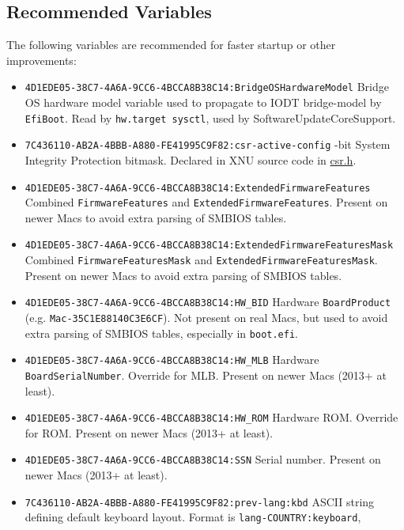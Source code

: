 \documentclass[]{article}
\providecommand{\tightlist}{%
  \setlength{\itemsep}{0pt}\setlength{\parskip}{0pt}}
\begin{document}
\subsection{Recommended Variables}\label{nvramvarsrec}

The following variables are recommended for faster startup or other
improvements:

\begin{itemize}
\tightlist
\item
  \texttt{4D1EDE05-38C7-4A6A-9CC6-4BCCA8B38C14:BridgeOSHardwareModel}
  \break
  Bridge OS hardware model variable used to propagate to IODT bridge-model
  by \texttt{EfiBoot}. Read by \texttt{hw.target sysctl}, used by
  SoftwareUpdateCoreSupport.
\item
  \texttt{7C436110-AB2A-4BBB-A880-FE41995C9F82:csr-active-config}
  -bit System Integrity Protection bitmask. Declared in XNU source code in
  \href{https://opensource.apple.com/source/xnu/xnu-4570.71.2/bsd/sys/csr.h.auto.html}{csr.h}.
\item
  \texttt{4D1EDE05-38C7-4A6A-9CC6-4BCCA8B38C14:ExtendedFirmwareFeatures}
  \break
  Combined \texttt{FirmwareFeatures} and \texttt{ExtendedFirmwareFeatures}. Present on
  newer Macs to avoid extra parsing of SMBIOS tables.
\item
  \texttt{4D1EDE05-38C7-4A6A-9CC6-4BCCA8B38C14:ExtendedFirmwareFeaturesMask}
  \break
  Combined \texttt{FirmwareFeaturesMask} and \texttt{ExtendedFirmwareFeaturesMask}.
  Present on newer Macs to avoid extra parsing of SMBIOS tables.
\item
  \texttt{4D1EDE05-38C7-4A6A-9CC6-4BCCA8B38C14:HW\_BID}
  \break
  Hardware \texttt{BoardProduct} (e.g. \texttt{Mac-35C1E88140C3E6CF}). Not present on
  real Macs, but used to avoid extra parsing of SMBIOS tables, especially in \texttt{boot.efi}.
\item
  \texttt{4D1EDE05-38C7-4A6A-9CC6-4BCCA8B38C14:HW\_MLB}
  \break
  Hardware \texttt{BoardSerialNumber}. Override for MLB. Present on newer Macs (2013+ at least).
\item
  \texttt{4D1EDE05-38C7-4A6A-9CC6-4BCCA8B38C14:HW\_ROM}
  \break
  Hardware ROM. Override for ROM. Present on newer Macs (2013+ at least).
\item
  \texttt{4D1EDE05-38C7-4A6A-9CC6-4BCCA8B38C14:SSN}
  \break
  Serial number. Present on newer Macs (2013+ at least).
\item
  \texttt{7C436110-AB2A-4BBB-A880-FE41995C9F82:prev-lang:kbd}
  \break
  ASCII string defining default keyboard layout. Format is \texttt{lang-COUNTRY:keyboard},

\end{itemize}
\end{document}
